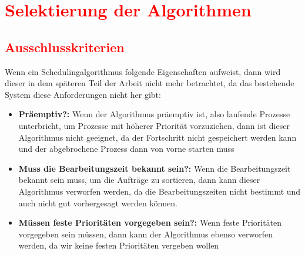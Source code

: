 \documentclass[
    12pt,               
    a4paper,            
    ngerman,            
    parskip=half,       
    headings=normal,   
    numbers=enddot,     
    toc=chapterentrywithdots 
]{scrreprt}\usepackage[utf8]{inputenc}
\begin{document}




\section{\textcolor{red}{Selektierung der Algorithmen}}
\subsection{\textcolor{red}{Ausschlusskriterien}}
Wenn ein Schedulingalgorithmus folgende Eigenschaften aufweist, dann wird dieser in dem späteren Teil der Arbeit nicht mehr betrachtet, da das bestehende System diese Anforderungen nicht her gibt:

\begin{itemize}
    \item \textbf{Präemptiv?:} Wenn der Algorithmus präemptiv ist, also laufende Prozesse unterbricht, um Prozesse mit höherer Priorität vorzuziehen, dann ist dieser Algorithmus nicht geeignet, da der Fortschritt nicht gespeichert werden kann und der abgebrochene Prozess dann von vorne starten muss
    \item \textbf{Muss die Bearbeitungszeit bekannt sein?:} Wenn die Bearbeitungszeit bekannt sein muss, um die Aufträge zu sortieren, dann kann dieser Algorithmus verworfen werden, da die Bearbeitungszeiten nicht bestimmt und auch nicht gut vorhergesagt werden können.
    \item \textbf{Müssen feste Prioritäten vorgegeben sein?:} Wenn feste Prioritäten vorgegeben sein müssen, dann kann der Algorithmus ebenso verworfen werden, da wir keine festen Prioritäten vergeben wollen
\end{itemize}
\end{document}

